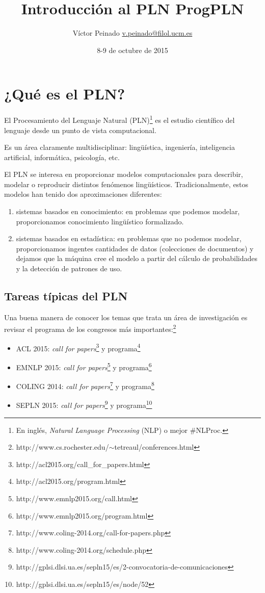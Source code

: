 \documentclass[]{tufte-handout}
\title{Introducción al PLN \textbar{} ProgPLN}
\author{Víctor Peinado
\href{mailto:v.peinado@filol.ucm.es}{v.peinado@filol.ucm.es}}
\date{8-9 de octubre de 2015}
\begin{document}
\maketitle



\section{¿Qué es el PLN?}\label{que-es-el-pln}

El Procesamiento del Lenguaje Natural
(PLN)\footnote{En inglés, \textit{Natural Language Processing} (NLP) o mejor \#NLProc.}
es el estudio científico del lenguaje desde un punto de vista
computacional.

Es un área claramente multidisciplinar: lingüística, ingeniería,
inteligencia artificial, informática, psicología, etc.

El PLN se interesa en proporcionar modelos computacionales para
describir, modelar o reproducir distintos fenómenos lingüísticos.
Tradicionalmente, estos modelos han tenido dos aproximaciones
diferentes:

\begin{enumerate}
\def\labelenumi{\arabic{enumi}.}
\item
  sistemas basados en conocimiento: en problemas que podemos modelar,
  proporcionamos conocimiento lingüístico formalizado.
\item
  sistemas basados en estadística: en problemas que no podemos modelar,
  proporcionamos ingentes cantidades de datos (colecciones de
  documentos) y dejamos que la máquina cree el modelo a partir del
  cálculo de probabilidades y la detección de patrones de uso.
\end{enumerate}

\subsection{Tareas típicas del PLN}\label{tareas-tipicas-del-pln}

Una buena manera de conocer los temas que trata un área de investigación
es revisar el programa de los congresos más
importantes:\footnote{http://www.cs.rochester.edu/$\sim$tetreaul/conferences.html}

\begin{itemize}
\item
  ACL 2015: \emph{call for
  papers}\footnote{http://acl2015.org/call\_for\_papers.html} y
  programa\footnote{http://acl2015.org/program.html}
\item
  EMNLP 2015: \emph{call for
  papers}\footnote{http://www.emnlp2015.org/call.html} y
  programa\footnote{http://www.emnlp2015.org/program.html}
\item
  COLING 2014: \emph{call for
  papers}\footnote{http://www.coling-2014.org/call-for-papers.php} y
  programa\footnote{http://www.coling-2014.org/schedule.php}
\item
  SEPLN 2015: \emph{call for
  papers}\footnote{http://gplsi.dlsi.ua.es/sepln15/es/2-convocatoria-de-comunicaciones}
  y programa\footnote{http://gplsi.dlsi.ua.es/sepln15/es/node/52}
\end{itemize}
\end{document}
